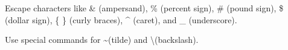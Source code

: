 Escape characters like \& (ampersand), \% (percent sign),
\# (pound sign), \$ (dollar sign), \{ \} (curly braces),
\^{} (caret), and \_ (underscore).

Use special commands for \textasciitilde (tilde) and 
\textbackslash (backslash).
